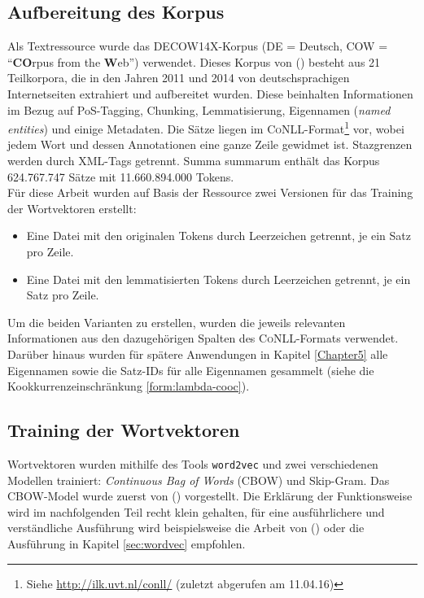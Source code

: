   \subsection{Aufbereitung des Korpus}\label{sec:corpusprep}

  Als Textressource wurde das DECOW14X-Korpus (DE = Deutsch, COW = ``\textbf{CO}rpus from the \textbf{W}eb'') verwendet.
  Dieses Korpus von (\cite{schafer2012building}) besteht aus 21 Teilkorpora,
  die in den Jahren 2011 und 2014 von deutschsprachigen Internetseiten extrahiert und aufbereitet wurden. Diese beinhalten
  Informationen im Bezug auf PoS-Tagging, Chunking, Lemmatisierung, Eigennamen (\emph{named entities}) und einige Metadaten.
  Die Sätze liegen im \textsc{CoNLL}-Format\footnote{Siehe \url{http://ilk.uvt.nl/conll/} (zuletzt abgerufen am 11.04.16)} vor,
  wobei jedem Wort und dessen Annotationen eine ganze Zeile gewidmet ist.
  Stazgrenzen werden durch XML-Tags getrennt. Summa summarum enthält das Korpus 624.767.747 Sätze mit 11.660.894.000 Tokens.\\

  Für diese Arbeit wurden auf Basis der Ressource zwei Versionen für das Training der Wortvektoren erstellt:
  \begin{itemize}
      \item Eine Datei mit den originalen Tokens durch Leerzeichen getrennt, je ein Satz pro Zeile.
      \item Eine Datei mit den lemmatisierten Tokens durch Leerzeichen getrennt, je ein Satz pro Zeile.
  \end{itemize}

  Um die beiden Varianten zu erstellen, wurden die jeweils relevanten Informationen aus den dazugehörigen Spalten des
  \textsc{CoNLL}-Formats verwendet.\\
  Darüber hinaus wurden für spätere Anwendungen in Kapitel \ref{Chapter5} alle Eigennamen sowie die Satz-IDs für
  alle Eigennamen gesammelt (siehe die Kookkurrenzeinschränkung \ref{form:lambda-cooc}).

  \subsection{Training der Wortvektoren}\label{sec:vectrain}

  Wortvektoren wurden mithilfe des Tools \verb|word2vec| und zwei verschiedenen Modellen trainiert: \emph{Continuous Bag of Words} (CBOW)
  und Skip-Gram. Das CBOW-Model wurde zuerst von (\cite{mikolov2013efficient}) vorgestellt. Die Erklärung der Funktionsweise
  wird im nachfolgenden Teil recht klein gehalten, für eine ausführlichere und verständliche Ausführung wird beispielsweise
  die Arbeit von (\cite{rong2014word2vec}) oder die Ausführung in Kapitel \ref{sec:wordvec} empfohlen.\\

